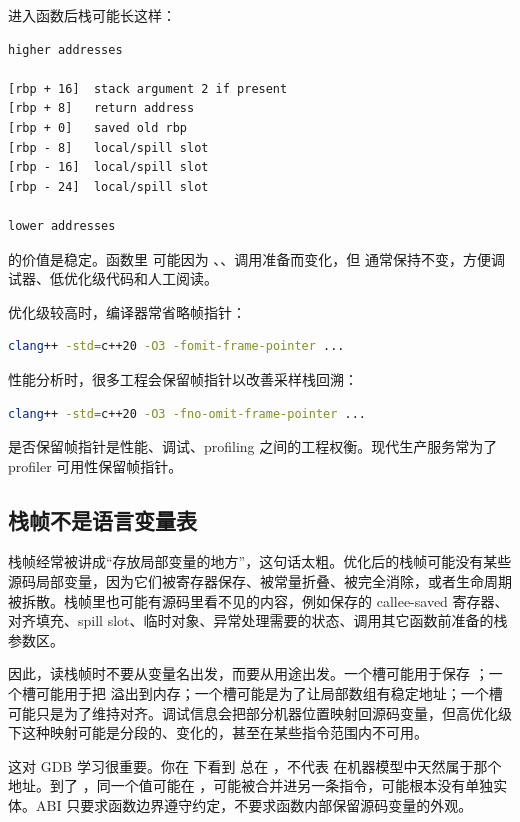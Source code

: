 进入函数后栈可能长这样：

\begin{lstlisting}
higher addresses

[rbp + 16]  stack argument 2 if present
[rbp + 8]   return address
[rbp + 0]   saved old rbp
[rbp - 8]   local/spill slot
[rbp - 16]  local/spill slot
[rbp - 24]  local/spill slot

lower addresses
\end{lstlisting}

 的价值是稳定。函数里  可能因为 、、调用准备而变化，但  通常保持不变，方便调试器、低优化级代码和人工阅读。

优化级较高时，编译器常省略帧指针：

\begin{lstlisting}[language=bash]
clang++ -std=c++20 -O3 -fomit-frame-pointer ...
\end{lstlisting}

性能分析时，很多工程会保留帧指针以改善采样栈回溯：

\begin{lstlisting}[language=bash]
clang++ -std=c++20 -O3 -fno-omit-frame-pointer ...
\end{lstlisting}

是否保留帧指针是性能、调试、profiling 之间的工程权衡。现代生产服务常为了 profiler 可用性保留帧指针。

\subsection{栈帧不是语言变量表}

栈帧经常被讲成“存放局部变量的地方”，这句话太粗。优化后的栈帧可能没有某些源码局部变量，因为它们被寄存器保存、被常量折叠、被完全消除，或者生命周期被拆散。栈帧里也可能有源码里看不见的内容，例如保存的 callee-saved 寄存器、对齐填充、spill slot、临时对象、异常处理需要的状态、调用其它函数前准备的栈参数区。

因此，读栈帧时不要从变量名出发，而要从用途出发。一个槽可能用于保存 ；一个槽可能用于把  溢出到内存；一个槽可能是为了让局部数组有稳定地址；一个槽可能只是为了维持对齐。调试信息会把部分机器位置映射回源码变量，但高优化级下这种映射可能是分段的、变化的，甚至在某些指令范围内不可用。

这对 GDB 学习很重要。你在  下看到  总在 \code{[rbp - 4]}，不代表  在机器模型中天然属于那个地址。到了 ，同一个值可能在 ，可能被合并进另一条指令，可能根本没有单独实体。ABI 只要求函数边界遵守约定，不要求函数内部保留源码变量的外观。


